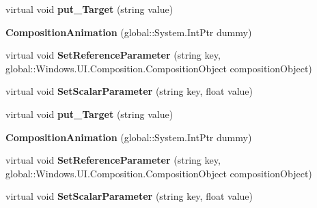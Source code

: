 \begin{DoxyCompactItemize}
virtual void {\bfseries put\+\_\+\+Target} (string value)
\item 
\mbox{\label{class_windows_1_1_u_i_1_1_composition_1_1_composition_animation_ae967a843f8543e354ae2d891eaad7df5}} 
{\bfseries Composition\+Animation} (global\+::\+System.\+Int\+Ptr dummy)
\item 
\mbox{\label{class_windows_1_1_u_i_1_1_composition_1_1_composition_animation_a6aef4c6354f81b68470b59c2583862d0}} 
virtual void {\bfseries Set\+Reference\+Parameter} (string key, global\+::\+Windows.\+U\+I.\+Composition.\+Composition\+Object composition\+Object)
\item 
\mbox{\label{class_windows_1_1_u_i_1_1_composition_1_1_composition_animation_a9338e6aa927cdc031e0533dfec0fc5bb}} 
virtual void {\bfseries Set\+Scalar\+Parameter} (string key, float value)
\item 
\mbox{\label{class_windows_1_1_u_i_1_1_composition_1_1_composition_animation_a59f79df972c8170dc1fd9329bb0fdb0c}} 
virtual void {\bfseries put\+\_\+\+Target} (string value)
\item 
\mbox{\label{class_windows_1_1_u_i_1_1_composition_1_1_composition_animation_ae967a843f8543e354ae2d891eaad7df5}} 
{\bfseries Composition\+Animation} (global\+::\+System.\+Int\+Ptr dummy)
\item 
\mbox{\label{class_windows_1_1_u_i_1_1_composition_1_1_composition_animation_a6aef4c6354f81b68470b59c2583862d0}} 
virtual void {\bfseries Set\+Reference\+Parameter} (string key, global\+::\+Windows.\+U\+I.\+Composition.\+Composition\+Object composition\+Object)
\item 
\mbox{\label{class_windows_1_1_u_i_1_1_composition_1_1_composition_animation_a9338e6aa927cdc031e0533dfec0fc5bb}} 
virtual void {\bfseries Set\+Scalar\+Parameter} (string key, float value)

\end{DoxyCompactItemize}
